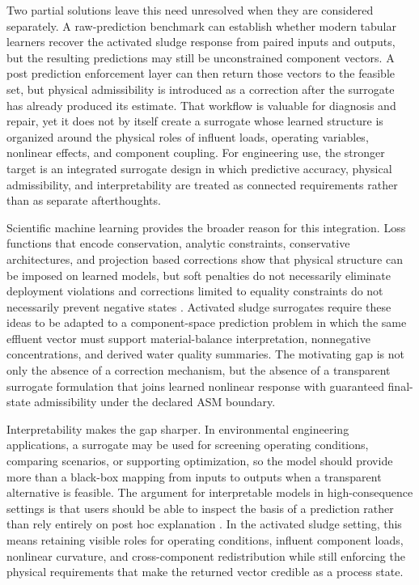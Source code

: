 \documentclass[12pt, twoside]{book}
\begin{document}
Two partial solutions leave this need unresolved when they are considered separately. A raw-prediction
benchmark can establish whether modern tabular learners recover the activated sludge response from paired
inputs and outputs, but the resulting predictions may still be unconstrained component vectors. A post
prediction enforcement layer can then return those vectors to the feasible set, but physical admissibility is
introduced as a correction after the surrogate has already produced its estimate. That workflow is valuable
for diagnosis and repair, yet it does not by itself create a surrogate whose learned structure is organized
around the physical roles of influent loads, operating variables, nonlinear effects, and component coupling.
For engineering use, the stronger target is an integrated surrogate design in which predictive accuracy,
physical admissibility, and interpretability are treated as connected requirements rather than as separate
afterthoughts.

Scientific machine learning provides the broader reason for this integration. Loss functions that encode
conservation, analytic constraints, conservative architectures, and projection based corrections show that
physical structure can be imposed on learned models, but soft penalties do not necessarily eliminate deployment
violations and corrections limited to equality constraints do not necessarily prevent negative states
\citep{Raissi2019,Beucler2021,Hansen2024,SturmWexler2020,SturmWexler2022,KircherVotsmeier2025,Valente2025}.
Activated sludge surrogates require these ideas to be adapted to a component-space prediction problem in which
the same effluent vector must support material-balance interpretation, nonnegative concentrations, and derived
water quality summaries. The motivating gap is not only the absence of a correction mechanism, but the absence
of a transparent surrogate formulation that joins learned nonlinear response with guaranteed final-state
admissibility under the declared ASM boundary.

Interpretability makes the gap sharper. In environmental engineering applications, a surrogate may be used for
screening operating conditions, comparing scenarios, or supporting optimization, so the model should provide
more than a black-box mapping from inputs to outputs when a transparent alternative is feasible. The argument
for interpretable models in high-consequence settings is that users should be able to inspect the basis of a
prediction rather than rely entirely on post hoc explanation \citep{Rudin2019}. In the activated sludge
setting, this means retaining visible roles for operating conditions, influent component loads, nonlinear
curvature, and cross-component redistribution while still enforcing the physical requirements that make the
returned vector credible as a process state.
\end{document}
